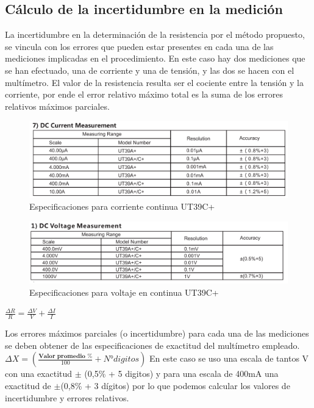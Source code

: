 \documentclass[12pt, letterpaper]{article}
\begin{document}
\subsection{Cálculo de la incertidumbre en la medición}

La incertidumbre en la determinación de la resistencia por el método propuesto, se vincula con los 
errores que pueden estar presentes en cada una de las mediciones implicadas en el procedimiento. En 
este caso hay dos mediciones que se han efectuado, una de corriente y una de tensión, y las dos se 
hacen con el multímetro. El valor de la resistencia resulta ser el cociente entre la tensión y la 
corriente, por ende el error relativo máximo total es la suma de los errores relativos máximos parciales.
\singlespacing
\begin{figure}[H]
		\centering
		\includegraphics{imagenes/DC_ut39c.png}
		\caption{Especificaciones para corriente continua UT39C+}
        \label{fig:DC_UT39C}
	\end{figure}
 \begin{figure}[H]
		\centering
		\includegraphics{imagenes/DV_ut39c.png}
		\caption{Especificaciones para voltaje en continua UT39C+}
        \label{fig:DV_UT39C}
	\end{figure}
$\frac{\Delta R}{R} = \frac{\Delta V}{V}+\frac{\Delta I}{I}$

\singlespacing
Los errores máximos parciales (o incertidumbre) para cada una de las mediciones se deben 
obtener de las especificaciones de exactitud del multímetro empleado. 
\singlespacing
$\Delta X=( \frac{\textbf{Valor promedio \%}}{100} + N° digitos)$
\singlespacing
En este caso se uso una escala de tantos V con una exactitud $\pm$ (0,5\% + 5 digitos) y para una escala de 400mA una exactitud de $\pm$(0,8\% + 3 dígitos)
por lo que podemos calcular los valores de incertidumbre y errores relativos.
\singlespacing  
\end{document}
